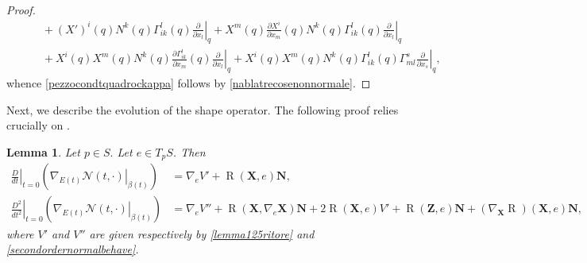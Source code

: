 \documentclass[11pt]{amsart}
\newcommand{\n}[1]{\nabla^\varepsilon_{ #1 }}
\newcommand{\N}{\mathcal N}
\newcommand{\X}{\mathbf{X}}
\newcommand{\Z}{\mathbf{Z}}
\renewcommand{\n}{\mathbf{N}}
\DeclareMathOperator{\R}{R}
\newtheorem{lemma}[theorem]{Lemma}
\theoremstyle{definition}
\theoremstyle{remark}
\numberwithin{equation}{section}
\begin{document}
\begin{proof}
\begin{equation*}
\begin{split}
    &\qquad+\left(X'\right)^i(q)N^k(q)\Gamma_{ik}^l(q)\left.\frac{\partial}{\partial x_l}\right|_{q}+X^m(q)\frac{\partial X^i}{\partial x_m}(q)N^k(q)\Gamma_{ik}^l(q)\left.\frac{\partial}{\partial x_l}\right|_{q}\\
    &\qquad+X^i(q)X^m(q)N^k(q)\frac{\partial \Gamma_{ik}^l}{\partial x_m}(q)\left.\frac{\partial}{\partial x_l}\right|_{q}+X^i(q)X^m(q)N^k(q)\Gamma^l_{ik}(q)\Gamma^s_{ml}\left.\frac{\partial}{\partial x_s}\right|_q,
\end{split}
\end{equation*}
whence \eqref{pezzocondtquadrockappa} follows by \eqref{nablatrecosenonnormale}.
\end{proof}
Next, we describe the evolution of the shape operator. The following proof relies crucially on .
\begin{lemma}\label{lemmaevoluzioneshapeoperatoririem3858943}
    Let $p\in S.$ Let $e\in T_p S$. Then
    \begin{align}
          \left.\frac{D}{dt}\right|_{t=0}\left(\left.\nabla_{E(t)}\N(t,\cdot)\right|_{\beta(t)}\right)&=\nabla_eV'+\R(\X,e)\n ,\label{protreaux}\\
            \left.\frac{D^2}{dt^2}\right|_{t=0}\left(\left.\nabla_{E(t)}\N(t,\cdot)\right|_{\beta(t)}\right)&=\nabla_e V''+\R\left(\X,\nabla_e\X\right)\n+2\R(\X,e)V'+\R\left(\Z,e\right)\n+\left(\nabla_\X \R\right)(\X,e)\n\label{proquattroaux},
    \end{align}
    where $V'$ and $V''$ are given respectively by \eqref{lemma125ritore} and \eqref{secondordernormalbehave}.
\end{lemma}
\end{document}
